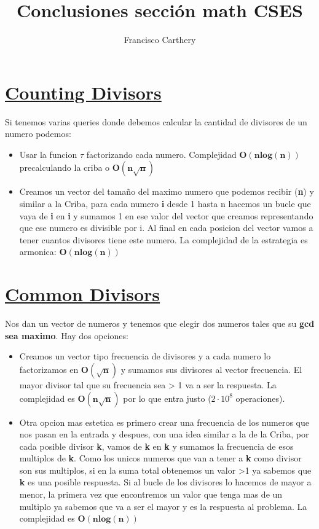 \documentclass{article}
\title{Conclusiones sección math CSES}
\author{Francisco Carthery}
\begin{document}
\maketitle

\section{\href{https://cses.fi/problemset/task/1713}{Counting Divisors}}
Si tenemos varias queries donde debemos calcular la cantidad de divisores de un numero podemos:
\begin{itemize}
    \item Usar la funcion $\tau$ factorizando cada numero. Complejidad $\bm{O(nlog(n))}$ precalculando la criba o $\bm{O(n \sqrt{n})}$
    \item Creamos un vector del tamaño del maximo numero que podemos recibir (\textbf{n}) y similar a la Criba, para cada numero \textbf{i} desde 1 hasta n hacemos un bucle que vaya de \textbf{i} en \textbf{i} y sumamos 1 en ese valor del vector que creamos representando que ese numero es divisible por i. Al final en cada posicion del vector vamos a tener cuantos divisores tiene este numero. La complejidad de la estrategia es armonica: $\bm{O(nlog(n))}$
\end{itemize}

\section{\href{https://cses.fi/problemset/task/1081}{Common Divisors}}
Nos dan un vector de numeros y tenemos que elegir dos numeros tales que su \textbf{gcd sea maximo}. Hay dos opciones:
\begin{itemize}
    \item Creamos un vector tipo frecuencia de divisores y a cada numero lo factorizamos en $\bm{O(\sqrt{n})}$ y sumamos sus divisores al vector frecuencia. El mayor divisor tal que su frecuencia sea > 1 va a ser la respuesta. La complejidad es $\bm{O(n \sqrt{n})}$ por lo que entra justo ($2 \cdot 10^8$ operaciones).
    \item Otra opcion mas estetica es primero crear una frecuencia de los numeros que nos pasan en la entrada y despues, con una idea similar a la de la Criba, por cada posible divisor \textbf{k}, vamos de \textbf{k} en \textbf{k} y sumamos la frecuencia de esos multiplos de \textbf{k}. Como los unicos numeros que van a tener a \textbf{k} como divisor son sus multiplos, si en la suma total obtenemos un valor >1 ya sabemos que \textbf{k} es una posible respuesta. Si al bucle de los divisores lo hacemos de mayor a menor, la primera vez que encontremos un valor que tenga mas de un multiplo ya sabemos que va a ser el mayor y es la respuesta al problema. La complejidad es $\bm{O(nlog(n))}$
\end{itemize}
\end{document}
